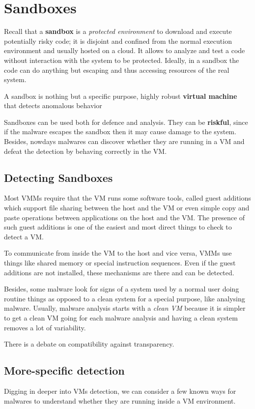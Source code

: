 \section{Sandboxes}
Recall that a \textbf{sandbox} is a \textit{protected environment} to download and execute potentially risky code;
it is disjoint and confined from the normal execution environment and usually hosted
on a cloud.
It allows to analyze and test a code without
interaction with the system to be protected.
Ideally, in a sandbox the code can do anything but escaping and thus accessing resources of the real system.

A sandbox is nothing but a specific purpose, highly robust \textbf{virtual machine}
that detects anomalous behavior 

Sandboxes can be used both for defence and analysis.
They can be \textbf{riskful}, 
since if the malware escapes the sandbox then it may cause damage to the system.
Besides, nowdays malwares can discover whether they are running in a VM and defeat the detection by behaving correctly in the VM.

\subsection{Detecting Sandboxes}
Most VMMs require that the VM runs some software tools, called guest
additions which support file sharing between the host and the VM or even simple
copy and paste operations between applications on the host and the VM.
The presence of such  guest additions is one of the easiest and most direct things to
check to detect a VM.

To communicate from inside the VM to the host and vice versa, VMMs use
things like shared memory or special instruction sequences.
Even if the guest
additions are not installed, these mechanisms are there and can be detected.

Besides, some malware look for signs of a system used by a normal user doing routine
things as opposed to a clean system for a special purpose, like analysing
malware.
Usually, malware analysis starts with a \textit{clean VM} because it is simpler
to get a clean VM going for each malware analysis and having a clean system
removes a lot of variability.

There is a debate on compatibility against transparency.

\subsection{More-specific detection}
Digging in deeper into VMs detection, we can consider a few known ways for malwares to understand whether they are running inside a VM environment.

